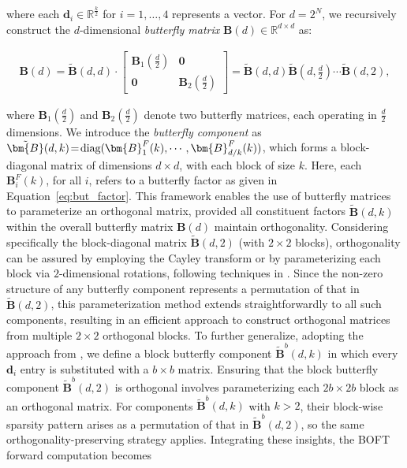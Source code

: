 where each $\bm{d}_i\in\mathbb{R}^{\frac{k}{2}}$ for $i=1,\ldots,4$ represents a vector. For $d=2^N$, we recursively construct the $d$-dimensional \emph{butterfly matrix} $\bm{B}(d)\in\mathbb{R}^{d\times d}$ as:

\begin{equation}
\begin{aligned}
    \!\!\bm{B}(d)=\tilde{\bm{B}}(d,d)\!\cdot\!\begin{bmatrix}
    \bm{B}_1(\frac{d}{2})\!\!\!\!\! & \bm{0} \\
    \bm{0}\!\!\!\!\! &\bm{B}_2(\frac{d}{2})
    \end{bmatrix}= \tilde{\bm{B}}(d,d)\tilde{\bm{B}}(d,\frac{d}{2})\cdots\tilde{\bm{B}}(d,2),
\end{aligned}
\end{equation}

where $\bm{B}_1(\frac{d}{2})$ and $\bm{B}_2(\frac{d}{2})$ denote two butterfly matrices, each operating in $\frac{d}{2}$ dimensions. We introduce the \emph{butterfly component} as $\thickmuskip=2mu \medmuskip=2mu \tilde{\bm{B}}(d,k)=\text{diag}(\bm{B}^F_1(k),\cdots,\bm{B}^F_{d/k}(k))$, which forms a block-diagonal matrix of dimensions $d \times d$, with each block of size $k$. Here, each $\bm{B}^F_i(k)$, for all $i$, refers to a butterfly factor as given in Equation~\ref{eq:but_factor}. This framework enables the use of butterfly matrices to parameterize an orthogonal matrix, provided all constituent factors $\tilde{\bm{B}}(d,k)$ within the overall butterfly matrix $\bm{B}(d)$ maintain orthogonality. Considering specifically the block-diagonal matrix $\tilde{\bm{B}}(d,2)$ (with $2\times 2$ blocks), orthogonality can be assured by employing the Cayley transform or by parameterizing each block via $2$-dimensional rotations, following techniques in \cite{liu2021orthogonal,qiu2023controlling}. Since the non-zero structure of any butterfly component represents a permutation of that in $\tilde{\bm{B}}(d,2)$, this parameterization method extends straightforwardly to all such components, resulting in an efficient approach to construct orthogonal matrices from multiple $2 \times 2$ orthogonal blocks. To further generalize, adopting the approach from \cite{chen2022pixelated}, we define a block butterfly component $\tilde{\bm{B}}^b(d,k)$ in which every $\bm{d}_i$ entry is substituted with a $b \times b$ matrix. Ensuring that the block butterfly component $\tilde{\bm{B}}^b(d,2)$ is orthogonal involves parameterizing each $2b\times 2b$ block as an orthogonal matrix. For components $\tilde{\bm{B}}^b(d,k)$ with $k > 2$, their block-wise sparsity pattern arises as a permutation of that in $\tilde{\bm{B}}^b(d,2)$, so the same orthogonality-preserving strategy applies. Integrating these insights, the BOFT forward computation becomes

